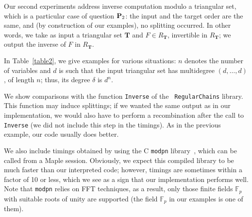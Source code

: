 \documentclass[12pt]{article}
\def\F {\ensuremath{\mathbb{F}}}
\def\Tt {\ensuremath{\mathbf{T}}}
\begin{document}
Our second experiments address inverse computation modulo a triangular
set, which is a particular case of question ${\bf P}_2$: the input and
the target order are the same, and (by construction of our examples),
no splitting occurred. In other words, we take as input a triangular
set $\Tt$ and $F\in R_\Tt$, invertible in $R_\Tt$; we output the
inverse of $F$ in $R_\Tt$.

In Table~\ref{table2}, we give examples for various situations: 
$n$ denotes the number of variables and $d$ is such that 
the input triangular set has multidegree $(d,\dots,d)$, of length $n$;
thus, its degree $\delta$ is $d^n$. 

We show comparisons with the function {\tt Inverse} of the {\tt
  RegularChains} library. This function may induce splittings; if we
wanted the same output as in our implementation, we would also have to
perform a recombination after the call to {\tt Inverse} (we did not
include this step in the timings). As in the previous example, our
code usually does better.

We also include timings obtained by using the C {\tt modpn}
library~\cite{LiMoRaSc09}, which can be called from a Maple
session. Obviously, we expect this compiled library to be much faster
than our interpreted code; however, timings are sometimes within a
factor of 10 or less, which we see as a sign that our implementation
performs well. Note that {\tt modpn} relies on FFT techniques, as a
result, only those finite fields $\F_p$ with suitable roots of unity
are supported (the field $\F_p$ in our examples is one of them).
\end{document}
